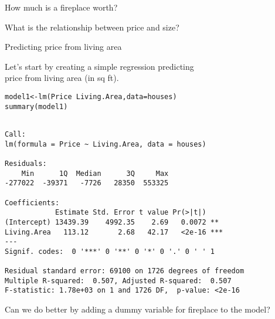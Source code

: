 \documentclass{beamer}\usepackage[]{graphicx}\usepackage[]{color}
\makeatletter
\newcommand{\hlopt}[1]{\textcolor[rgb]{1,0.894,0.769}{#1}}%
\newcommand{\hlstd}[1]{\textcolor[rgb]{1,0.894,0.769}{#1}}%
\newcommand{\hlkwb}[1]{\textcolor[rgb]{0.804,0.776,0.451}{#1}}%
\newcommand{\hlkwc}[1]{\textcolor[rgb]{0.78,0.941,0.545}{#1}}%
\newcommand{\hlkwd}[1]{\textcolor[rgb]{1,0.78,0.769}{#1}}%
\newenvironment{kframe}{%
 \def\at@end@of@kframe{}%
 \ifinner\ifhmode%
  \def\at@end@of@kframe{\end{minipage}}%
  \begin{minipage}{\columnwidth}%
 \fi\fi%
 \def\FrameCommand##1{\hskip\@totalleftmargin \hskip-\fboxsep
 \colorbox{shadecolor}{##1}\hskip-\fboxsep
     \hskip-\linewidth \hskip-\@totalleftmargin \hskip\columnwidth}%
 \MakeFramed {\advance\hsize-\width
   \@totalleftmargin\z@ \linewidth\hsize
   \@setminipage}}%
 {\par\unskip\endMakeFramed%
 \at@end@of@kframe}
\newenvironment{knitrout}{}{} %
\makeatother
\begin{document}
\begin{darkframes}
\begin{frame}[fragile]{How much is a fireplace worth?}
    \end{frame}

    \begin{frame}{What is the relationship between price and size?}
\begin{knitrout}


\end{knitrout}
    \end{frame}

    \begin{frame}{Predicting price from living area}
      \begin{center}
        Let's start by creating a simple regression predicting \\
        price from living area (in sq ft).
      \end{center}
    \end{frame}

    \begin{frame}[fragile]
      \fontsize{8}{8}\selectfont
\begin{knitrout}
\begin{kframe}
\begin{alltt}
\hlstd{model1} \hlkwb{<-} \hlkwd{lm}\hlstd{(Price} \hlopt{~} \hlstd{Living.Area,} \hlkwc{data}\hlstd{=houses)}
\hlkwd{summary}\hlstd{(model1)}
\end{alltt}
\begin{verbatim}

Call:
lm(formula = Price ~ Living.Area, data = houses)

Residuals:
    Min      1Q  Median      3Q     Max 
-277022  -39371   -7726   28350  553325 

Coefficients:
            Estimate Std. Error t value Pr(>|t|)    
(Intercept) 13439.39    4992.35    2.69   0.0072 ** 
Living.Area   113.12       2.68   42.17   <2e-16 ***
---
Signif. codes:  0 '***' 0 '**' 0 '*' 0 '.' 0 ' ' 1

Residual standard error: 69100 on 1726 degrees of freedom
Multiple R-squared:  0.507,	Adjusted R-squared:  0.507 
F-statistic: 1.78e+03 on 1 and 1726 DF,  p-value: <2e-16
\end{verbatim}
\end{kframe}
\end{knitrout}
    \end{frame}

    \begin{frame}
      \begin{center}
        Can we do better by adding a dummy variable for fireplace to the model?
      \end{center}
    \end{frame}


\end{darkframes}
\end{document}
